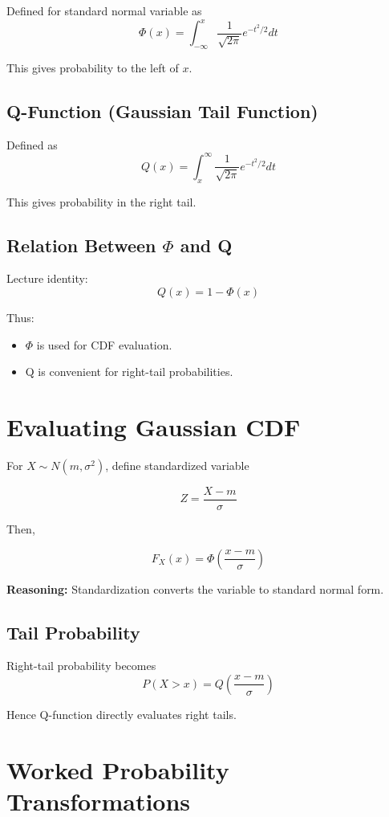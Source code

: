 \documentclass{article}
\begin{document}
Defined for standard normal variable as
\[
\Phi(x) = \int_{-\infty}^{x}
\frac{1}{\sqrt{2\pi}} e^{-t^2/2} dt
\]

This gives probability to the left of $x$.

\subsection{Q-Function (Gaussian Tail Function)}

Defined as
\[
Q(x) = \int_x^{\infty}
\frac{1}{\sqrt{2\pi}} e^{-t^2/2} dt
\]

This gives probability in the right tail.

\subsection{Relation Between $\Phi$ and Q}

Lecture identity:
\[
Q(x) = 1 - \Phi(x)
\]

Thus:
\begin{itemize}
    \item $\Phi$ is used for CDF evaluation.
    \item Q is convenient for right-tail probabilities.
\end{itemize}

\section{Evaluating Gaussian CDF}

For $X \sim N(m,\sigma^2)$, define standardized variable

\[
Z = \frac{X - m}{\sigma}
\]

Then,

\[
F_X(x) = \Phi\left(\frac{x - m}{\sigma}\right)
\]

\textbf{Reasoning:} Standardization converts the variable to standard normal form.

\subsection*{Tail Probability}

Right-tail probability becomes
\[
P(X > x) = Q\left(\frac{x - m}{\sigma}\right)
\]

Hence Q-function directly evaluates right tails.

\section{Worked Probability Transformations}
\end{document}
